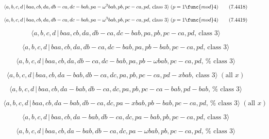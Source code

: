 \documentclass[10pt]{article}
\begin{document}
\begin{equation}
\langle a,b,c,d\,|\,baa,cb,da,db-ca,dc-bab,pa-\omega ^{2}bab,pb,pc-ca,pd,\,%
\text{class }3\rangle \;(p=1\func{mod}4)  \tag{7.4418}
\end{equation}

\begin{equation}
\langle a,b,c,d\,|\,baa,cb,da,db-ca,dc-bab,pa-\omega ^{3}bab,pb,pc-ca,pd,\,%
\text{class }3\rangle \;(p=1\func{mod}4)  \tag{7.4419}
\end{equation}

\begin{equation}
\langle a,b,c,d\,|\,baa,cb,da,db-ca,dc-bab,pa,pb,pc-ca,pd,\,\text{class }%
3\rangle  \tag{7.4420}
\end{equation}

\begin{equation}
\langle a,b,c,d\,|\,baa,cb,da,db-ca,dc-bab,pa,pb-bab,pc-ca,pd,\,\text{class }%
3\rangle  \tag{7.4421}
\end{equation}

\begin{equation}
\langle a,b,c,d\,|\,baa,cb,da,db-ca,dc-bab,pa,pb-\omega bab,pc-ca,pd,\,\text{%
class }3\rangle  \tag{7.4422}
\end{equation}

\begin{equation}
\langle a,b,c,d\,|\,baa,cb,da-bab,db-ca,dc,pa,pb,pc-ca,pd-xbab,\,\text{class 
}3\rangle \;(\text{all }x)  \tag{7.4423}
\end{equation}

\begin{equation}
\langle a,b,c,d\,|\,baa,cb,da-bab,db-ca,dc,pa,pb,pc-ca-bab,pd-bab,\,\text{%
class }3\rangle  \tag{7.4424}
\end{equation}

\begin{equation}
\langle a,b,c,d\,|\,baa,cb,da-bab,db-ca,dc,pa-xbab,pb-bab,pc-ca,pd,\,\text{%
class }3\rangle \;(\text{all }x)  \tag{7.4425}
\end{equation}

\begin{equation}
\langle a,b,c,d\,|\,baa,cb,da-bab,db-ca,dc,pa-bab,pb,pc-ca,pd,\,\text{class }%
3\rangle  \tag{7.4426}
\end{equation}

\begin{equation}
\langle a,b,c,d\,|\,baa,cb,da-bab,db-ca,dc,pa-\omega bab,pb,pc-ca,pd,\,\text{%
class }3\rangle  \tag{7.4427}
\end{equation}
\end{document}
